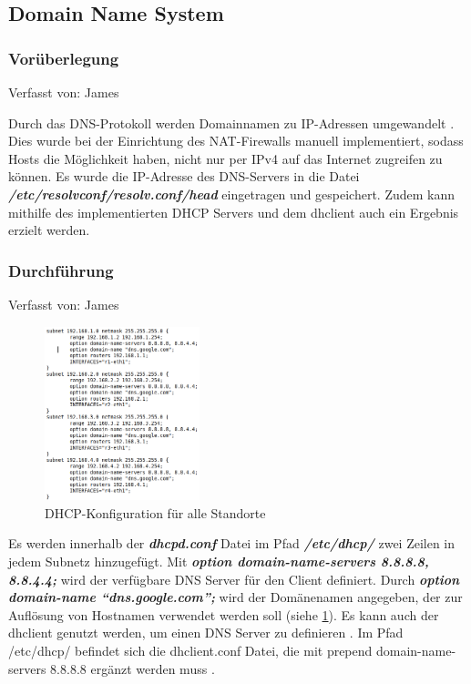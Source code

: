 \documentclass[fontsize=12pt,paper=a4,open=any,parskip=half,
  twoside=false,toc=listof,toc=bibliography,fleqn,leqno,
  captions=nooneline,captions=tableabove,british]{scrbook}
\begin{document}
{\subsection{Domain Name System}
\subsubsection{Vorüberlegung}
{\tiny Verfasst von: James\par}

Durch das DNS-Protokoll werden Domainnamen zu IP-Adressen umgewandelt \cite{baun2019grundlagen}. Dies wurde bei der Einrichtung des NAT-Firewalls manuell implementiert, sodass Hosts die Möglichkeit haben, nicht nur per IPv4 auf das Internet zugreifen zu können. Es wurde die IP-Adresse des DNS-Servers in die Datei \textit{\textbf{/etc/resolvconf/resolv.conf/head}} eingetragen und gespeichert. Zudem kann mithilfe des implementierten DHCP Servers und dem dhclient auch ein Ergebnis erzielt werden.  
\subsubsection{Durchführung}
{\tiny Verfasst von: James\par}

\begin{figure}
	\vspace{-\baselineskip}
	\centering
	\includegraphics[width=0.4\textwidth]{Bilder/dns}
	\caption{DHCP-Konfiguration für alle Standorte}
	\label{dns}
\end{figure}
Es werden innerhalb der \textit{\textbf{dhcpd.conf}} Datei im Pfad \textit{\textbf{/etc/dhcp/}} zwei Zeilen in jedem Subnetz hinzugefügt. Mit \textit{\textbf{option domain-name-servers 8.8.8.8, 8.8.4.4;}} wird der verfügbare DNS Server für den Client definiert. Durch \textit{\textbf{option domain-name “dns.google.com”;}} wird der Domänenamen angegeben, der zur Auflösung von Hostnamen verwendet werden soll \cite{dhcpd} (siehe \ref{dns}). Es kann auch der dhclient genutzt werden, um einen DNS Server zu definieren \cite{dhclient2}. Im Pfad /etc/dhcp/ befindet sich die dhclient.conf Datei, die mit prepend domain-name-servers 8.8.8.8 ergänzt werden muss \cite{dhclient3}. \par

}
\end{document}
